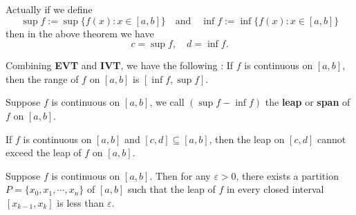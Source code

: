 	\begin{remarkenv}
		Actually if we define 
		\[
		\sup f:=\sup \{f(x):x\in [a,b]\}\quad \text{and} \quad
		\inf f:=\inf \{f(x):x\in [a,b]\}
		\]
		then in the above theorem we have
		\[
		c=\sup f,\quad d=\inf f.
		\]
	\end{remarkenv}
	\begin{corollaryenv}
		Combining \textbf{EVT} and \textbf{IVT}, we have the following : If $f$ is continuous on $[a,b]$, then the range of $f$ on $[a,b]$ is $[\inf f, \sup f]$.
	\end{corollaryenv}
	\begin{definitionenv}
		Suppose $f$ is continuous on $[a,b]$, we call $(\sup f - \inf f)$ the \textbf{leap} or \textbf{span} of $f$ on $[a,b]$.
	\end{definitionenv}
	\begin{propositionenv}
		If $f$ is continuous on $[a,b]$ and $[c,d]\subseteq [a,b]$, then the leap on $[c,d]$ cannot exceed the leap of $f$ on $[a,b]$.
	\end{propositionenv}
	\begin{theoremenv}
		Suppose $f$ is continuous on $[a,b]$. Then for any $\varepsilon>0$, there exists a partition $P=\{x_0,x_1,\cdots,x_n\}$ of $[a,b]$ such that the leap of $f$ in every closed interval $[x_{k-1},x_k]$ is less than $\varepsilon$.

		
	\end{theoremenv}
